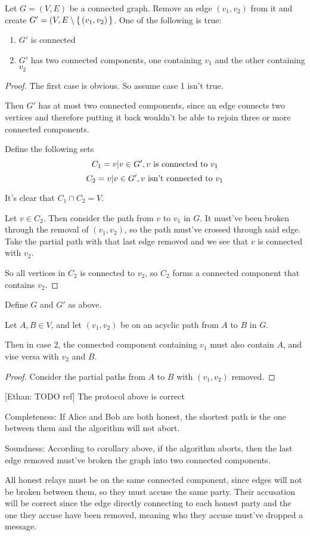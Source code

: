 \documentclass{article}
\newcommand{\Ethan}[1]{{\footnotesize\color{magenta}[Ethan: #1]}}
\begin{document}
\begin{thm}
	Let $G=(V,E)$ be a connected graph. Remove an edge $(v_1, v_2)$ from it and create $G'=(V,E\setminus\set{(v_1, v_2)}$. One of the following is true:
	\begin{enumerate}
	\item $G'$ is connected
	\item $G'$ has two connected components, one containing $v_1$ and the other containing $v_2$
	\end{enumerate}
\end{thm}
\begin{proof}
The first case is obvious. So assume case 1 isn't true.

Then $G'$ has at most two connected components, since an edge connects two vertices and therefore putting it back wouldn't be able to rejoin three or more connected components.

Define the following sets
$$C_1={v|v\in G', v \textnormal{ is connected to } v_1}$$
$$C_2={v|v\in G', v \textnormal{ isn't connected to } v_1}$$

It's clear that $C_1\cap C_2=V$.

Let $v\in C_2$. Then consider the path from $v$ to $v_1$ in $G$. It must've been broken through the removal of $(v_1, v_2)$, so the path must've crossed through said edge.
Take the partial path with that last edge removed and we see that $v$ is connected with $v_2$.

So all vertices in $C_2$ is connected to $v_2$, so $C_2$ forms a connected component that contains $v_2$.
\end{proof}
\begin{cor}
Define $G$ and $G'$ as above.

Let $A, B\in V$, and let $(v_1, v_2)$ be on an acyclic path from $A$ to $B$ in $G$.

Then in case 2, the connected component containing $v_1$ must also contain $A$, and vise versa with $v_2$ and $B$.
\end{cor}
\begin{proof}
Consider the partial paths from $A$ to $B$ with $(v_1, v_2)$ removed.
\end{proof}

\begin{thm}
\Ethan{TODO ref} The protocol above is correct

Completeness: If Alice and Bob are both honest, the shortest path is the one between them and the algorithm will not abort.

Soundness:
According to corollary above, if the algorithm aborts, then the last edge removed must've broken the graph into two connected components.

All honest relays must be on the same connected component, since edges will not be broken between them, so they must accuse the same party.
Their accusation will be correct since the edge directly connecting to each honest party and the one they accuse have been removed, meaning who they accuse must've dropped a message.

\end{thm}
\end{document}
